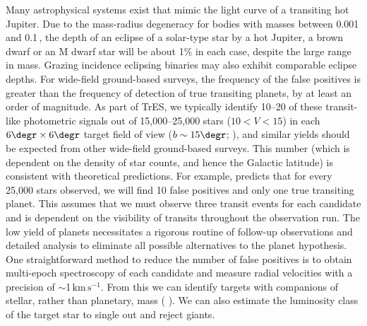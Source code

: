 Many astrophysical systems exist that mimic the light curve of a
transiting hot Jupiter. Due to the mass-radius degeneracy for bodies
with masses between 0.001 and 0.1\,\msun, the depth of an eclipse
of a solar-type star by a hot Jupiter, a brown dwarf or an M dwarf
star will be about 1\% in each case, despite the large range in mass.
Grazing incidence eclipsing binaries may also exhibit comparable
eclipse depths. For wide-field ground-based surveys, the frequency
of the false positives is greater than the frequency of detection of
true transiting planets, by at least an order of magnitude.  As part
of TrES, we typically identify 10--20 of these transit-like
photometric signals out of 15,000--25,000 stars ($10<V<15$) in each
$6\degr \times 6\degr$ target field of view ($b\sim15\degr$; %
\citealp[see, e.g.,][]{Dunham_Mandushev_Taylor:pasp:2004a}), and
similar yields should be expected from other wide-field ground-based
surveys. This number (which is dependent on the density of star
counts, and hence the Galactic latitude) is consistent with
theoretical predictions. For example, \citet{Brown:apjl:2003a} predicts
that for every 25,000 stars observed, we will find 10 false positives
and only one true transiting planet. This assumes that we must observe three transit events for each candidate and is dependent on the
visibility of transits throughout the observation run. The low yield
of planets necessitates a rigorous routine of follow-up observations
and detailed analysis to eliminate all possible alternatives to the
planet hypothesis. One straightforward method to reduce the number of
false positives is to obtain multi-epoch spectroscopy of each
candidate and measure radial velocities with a precision of $\sim$1\,$\mathrm{km\,s^{-1}}$. From this we can identify targets with
companions of stellar, rather than planetary, mass (%
\citealp[see,
e.g.,][]{Latham:ASP:2003a, Charbonneau_Brown_Dunham:AIP:2004a}). We can
also estimate the luminosity class of the target star to single out
and reject giants.


